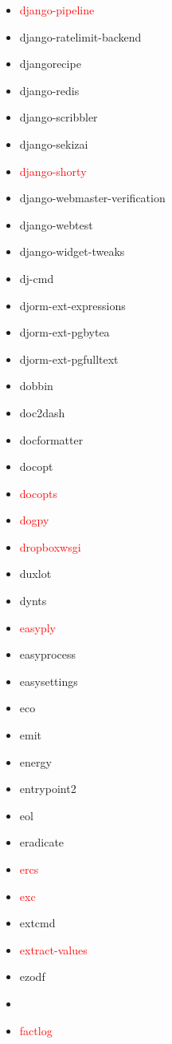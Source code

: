 \documentclass{l4proj}
\begin{document}
\begin{appendices}
{\begin{itemize}
\item\textcolor{red}{django-pipeline}
\item django-ratelimit-backend
\item djangorecipe
\item django-redis
\item django-scribbler
\item django-sekizai
\item\textcolor{red}{django-shorty}
\item django-webmaster-verification
\item django-webtest
\item django-widget-tweaks
\item dj-cmd
\item djorm-ext-expressions
\item djorm-ext-pgbytea
\item djorm-ext-pgfulltext
\item dobbin
\item doc2dash
\item docformatter
\item docopt
\item\textcolor{red}{docopts}
\item\textcolor{red}{dogpy}
\item\textcolor{red}{dropboxwsgi}
\item duxlot
\item dynts
\item\textcolor{red}{easyply}
\item easyprocess
\item easysettings
\item eco
\end{itemize}
}%
\clearpage
\noindent\parbox[t]{0.32\textwidth}{\raggedright%
\begin{itemize}
\item emit
\item energy
\item entrypoint2
\item eol
\item eradicate
\item\textcolor{red}{ercs}
\item\textcolor{red}{exc}
\item extcmd
\item\textcolor{red}{extract-values}
\item ezodf
\item\textcolor{red}{}
\item\textcolor{red}{factlog}

\end{itemize}}
\end{appendices}
\end{document}
